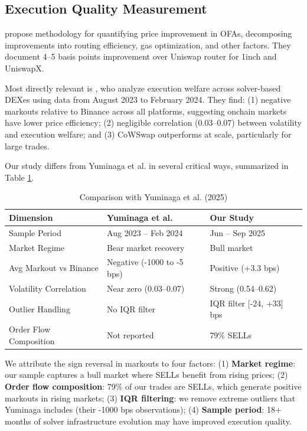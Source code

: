 \documentclass[12pt,a4paper]{article}
\begin{document}
\subsection{Execution Quality Measurement}

\cite{bachu2024} propose methodology for quantifying price improvement in OFAs, decomposing improvements into routing efficiency, gas optimization, and other factors. They document 4--5 basis points improvement over Uniswap router for 1inch and UniswapX.

Most directly relevant is \cite{yuminaga2025}, who analyze execution welfare across solver-based DEXes using data from August 2023 to February 2024. They find: (1) negative markouts relative to Binance across all platforms, suggesting onchain markets have lower price efficiency; (2) negligible correlation (0.03--0.07) between volatility and execution welfare; and (3) CoWSwap outperforms at scale, particularly for large trades.

Our study differs from Yuminaga et al. in several critical ways, summarized in Table \ref{tab:yuminaga_comparison}.

\begin{table}[H]
\centering
\caption{Comparison with Yuminaga et al. (2025)}
\label{tab:yuminaga_comparison}
\begin{tabular}{lll}
\toprule
\textbf{Dimension} & \textbf{Yuminaga et al.} & \textbf{Our Study} \\
\midrule
Sample Period & Aug 2023 -- Feb 2024 & Jun -- Sep 2025 \\
Market Regime & Bear market recovery & Bull market \\
Avg Markout vs Binance & Negative (-1000 to -5 bps) & Positive (+3.3 bps) \\
Volatility Correlation & Near zero (0.03--0.07) & Strong (0.54--0.62) \\
Outlier Handling & No IQR filter & IQR filter [-24, +33] bps \\
Order Flow Composition & Not reported & 79\% SELLs \\
\bottomrule
\end{tabular}
\end{table}

We attribute the sign reversal in markouts to four factors: (1) \textbf{Market regime}: our sample captures a bull market where SELLs benefit from rising prices; (2) \textbf{Order flow composition}: 79\% of our trades are SELLs, which generate positive markouts in rising markets; (3) \textbf{IQR filtering}: we remove extreme outliers that Yuminaga includes (their -1000 bps observations); (4) \textbf{Sample period}: 18+ months of solver infrastructure evolution may have improved execution quality.
\end{document}
